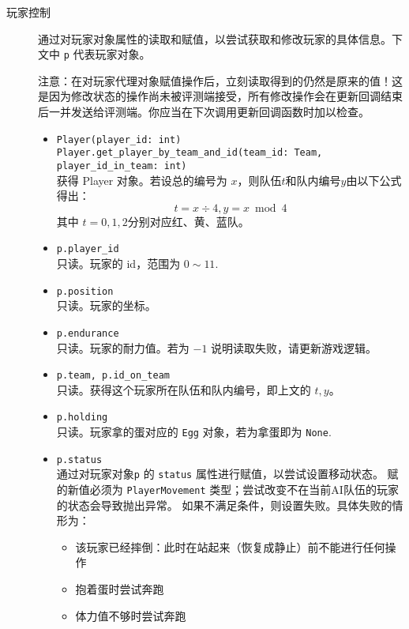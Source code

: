 \documentclass{article}
\begin{document}
\begin{description}
\item[玩家控制] 通过对玩家对象属性的读取和赋值，以尝试获取和修改玩家的具体信息。下文中 \lstinline{p} 代表玩家对象。

注意：在对玩家代理对象赋值操作后，立刻读取得到的仍然是原来的值！这是因为修改状态的操作尚未被评测端接受，所有修改操作会在更新回调结束后一并发送给评测端。你应当在下次调用更新回调函数时加以检查。
\begin{itemize}
	\item
  \lstinline{Player(player_id: int)}\\
  \lstinline{Player.get_player_by_team_and_id(team_id: Team, player_id_in_team: int)}\\[-2pt]
获得 Player 对象。若设总的编号为 $x$，则队伍$t$和队内编号$y$由以下公式得出：
\[t = x \div 4, y = x \bmod 4\]
其中 $t=0,1,2$分别对应红、黄、蓝队。

\item \lstinline{p.player_id}\\[-2pt]
只读。玩家的 id，范围为 $0 \sim 11$.

\item \lstinline{p.position}\\[-2pt]
只读。玩家的坐标。

\item \lstinline{p.endurance}\\[-2pt]
只读。玩家的耐力值。若为 $-1$ 说明读取失败，请更新游戏逻辑。

\item \lstinline{p.team, p.id_on_team}\\[-2pt]
只读。获得这个玩家所在队伍和队内编号，即上文的 $t, y$。

\item \lstinline{p.holding}\\[-2pt]
只读。玩家拿的蛋对应的 \lstinline{Egg} 对象，若为拿蛋即为 \lstinline{None}.

\item
\lstinline{p.status}\\[-2pt]
通过对玩家对象\lstinline{p} 的 \lstinline{status} 属性进行赋值，以尝试设置移动状态。
赋的新值必须为 \lstinline{PlayerMovement} 类型；尝试改变不在当前AI队伍的玩家的状态会导致抛出异常。
如果不满足条件，则设置失败。具体失败的情形为：
\begin{itemize}\setlength\itemsep{0em}
\item 该玩家已经摔倒：此时在站起来（恢复成静止）前不能进行任何操作
\item 抱着蛋时尝试奔跑
\item 体力值不够时尝试奔跑
\end{itemize}


\end{itemize}
\end{description}
\end{document}
